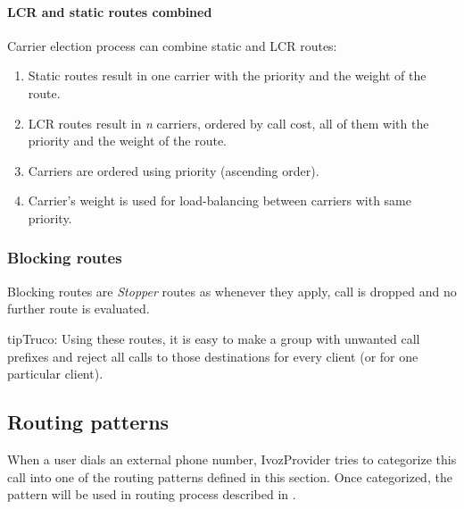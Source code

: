 \documentclass[letterpaper,10pt,spanish]{sphinxmanual}
\begin{document}
\paragraph{LCR and static routes combined}
\label{administration_portal/brand/routing/outgoing_routings:lcr-and-static-routes-combined}
Carrier election process can combine static and LCR routes:
\begin{enumerate}
\item {} 
Static routes result in one carrier with the priority and the weight of the route.

\item {} 
LCR routes result in \emph{n} carriers, ordered by call cost, all of them with the priority and the weight of the route.

\item {} 
Carriers are ordered using priority (ascending order).

\item {} 
Carrier's weight is used for load-balancing between carriers with same priority.

\end{enumerate}


\subsubsection{Blocking routes}
\label{administration_portal/brand/routing/outgoing_routings:blocking-routes}
Blocking routes are \emph{Stopper} routes as whenever they apply, call is dropped and no further route is evaluated.

\begin{notice}{tip}{Truco:}
Using these routes, it is easy to make a group with unwanted call prefixes and reject all calls to those
destinations for every client (or for one particular client).
\end{notice}
\label{administration_portal/brand/routing/routing_patterns:routing-patterns}

\subsection{Routing patterns}
\label{administration_portal/brand/routing/routing_patterns:id2}\label{administration_portal/brand/routing/routing_patterns::doc}\label{administration_portal/brand/routing/routing_patterns:routing-patterns}\label{administration_portal/brand/routing/routing_patterns:id1}
When a user dials an external phone number, IvozProvider tries to categorize
this call into one of the routing patterns defined in this section. Once categorized,
the pattern will be used in routing process described in {\hyperref[administration_portal/brand/routing/outgoing_routings:outgoing\string-routings]{}}.
\end{document}
